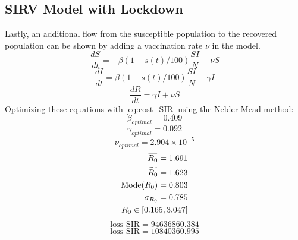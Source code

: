 \documentclass[tikz,fleqn,12pt]{wlscirep}
\newcommand{\overbar}[1]{\mkern 1.5mu\overline{\mkern-1.5mu#1\mkern-1.5mu}\mkern 1.5mu}
\begin{document}
\subsection{SIRV Model with Lockdown}
Lastly, an additional flow from the susceptible population to the recovered population can be shown by adding a vaccination rate $\nu$ in the model. 
\begin{equation}
  \frac{dS}{dt} = -\beta (1 - s(t)/100) \frac{S I}{N} - \nu S
  \label{eq:S_with_lockdown_and_nu}
\end{equation}
\begin{equation}
  \frac{dI}{dt} = \beta (1 - s(t)/100) \frac{S I}{N} - \gamma I
  \label{eq:I_with_lockdown_and_nu}
\end{equation}
\begin{equation}
  \frac{dR}{dt} = \gamma I + \nu S
  \label{eq:R_with_lockdown_and_nu}
\end{equation}
Optimizing these equations with \cref{eq:cost_SIR} using the Nelder-Mead method:
\begin{equation}
  \beta_{optimal} = 0.409
  \label{eq:beta_optimal_with_lockdown_and_nu}
\end{equation}
\begin{equation}
  \gamma_{optimal} = 0.092
  \label{eq:gamma_optimal_with_lockdown_and_nu}
\end{equation}
\begin{equation}
  \nu_{optimal} = 2.904 \times 10^{-5}
  \label{eq:nu_optimal_with_lockdown_and_nu}
\end{equation}
\begin{equation}
  \begin{split}
    \overbar{R_0} = 1.691 \\
    \widetilde{R_0} = 1.623 \\
    \text{Mode}(R_0) = 0.803 \\
    \sigma_{R_0} = 0.785 \\
    R_0 \in [0.165, 3.047]
  \end{split}
  \label{eq:r0_with_lockdown_and_nu}
\end{equation}
\begin{equation}
  \textrm{loss\_SIR} = 94636860.384
  \label{eq:cost_SIR_with_lockdown_and_nu}
\end{equation}
\begin{equation}
  \textrm{loss\_SIR} = 10840360.995
  \label{eq:cost_I_with_lockdown_and_nu}
\end{equation}
\end{document}
